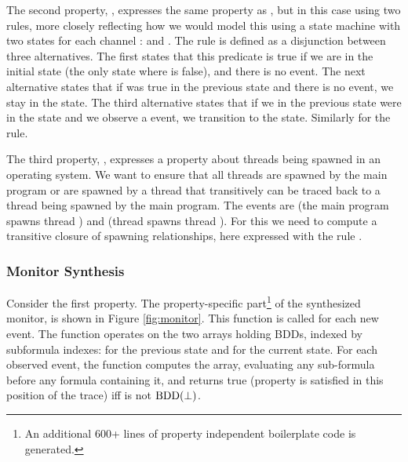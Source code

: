 The second property, , expresses the same 
property as , but in this case using two 
rules, more closely reflecting how we would model this using a state machine with two states for each channel : 
 and . The rule  is defined as a disjunction between three alternatives. The first states that this predicate is true if we are in the initial state 
(the only state where  is false), and there is no  event. The next alternative states that
if  was true in the previous state and there is
no  event, we stay in the  state.
The third alternative states that if we in the previous state were
in the  state and we observe a  event, we transition to the  state. Similarly for the  rule.

The third property, , expresses a property
about threads being spawned in an operating system. We want to 
ensure that all threads are spawned by the main program or are spawned by a thread that transitively can be traced back to a thread being spawned by the main program. The events are
 (the main program spawns thread ) and
 (thread  spawns thread ).
For this we need to compute a transitive closure of spawning relationships, here expressed with the rule .

\subsubsection{Monitor Synthesis}

Consider the first  property. The property-specific 
part\footnote{An additional 600+ lines of property independent 
boilerplate code is generated.} of the synthesized monitor, is shown 
in Figure \ref{fig:monitor}. This function is called for each new event. The function operates on the two arrays holding BDDs, indexed by subformula indexes:  for the previous state and  for the current state. For each observed event, the function  computes the  array, evaluating any sub-formula before any formula containing it,
and returns true (property is satisfied in this position of the trace)  iff  is not $\mathrm{BDD}(\bot)$. 

